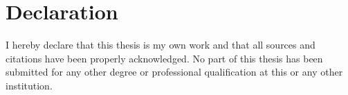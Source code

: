 
\chapter*{Declaration}

I hereby declare that this thesis is my own work and that all sources and citations have been properly acknowledged. No part of this thesis has been submitted for any other degree or professional qualification at this or any other institution.

